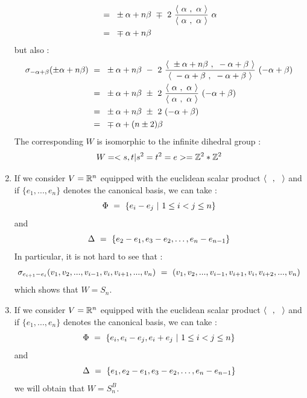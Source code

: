 \begin{enumerate}
\begin{equation}
\begin{split}
	&=\text{ }  \pm\alpha +n\beta\text{ } \mp\text{ } 2\text{ } \frac{\langle\text{ } \alpha \text{ },\text{ }\alpha\text{ }\rangle}{\langle\text{ } \alpha\text{ },\text{ }\alpha\text{ }\rangle}\text{ }\alpha \\
	&=\text{ } \mp \alpha +n\beta
	\end{split}
	\end{equation}
	but also :
	\begin{equation}
	\begin{split}
	\sigma_{-\alpha+\beta}(\pm\alpha+n\beta)\text{ } &=\text{ }  \pm\alpha+n\beta\text{ } -\text{ } 2\text{ } \frac{\langle\text{ } \pm\alpha+n\beta\text{ },\text{ }-\alpha+\beta\text{ }\rangle}{\langle\text{ } -\alpha+\beta\text{ },\text{ }-\alpha+\beta\text{ }\rangle}\text{ }(-\alpha+\beta)\\
	&=\text{ } \pm\alpha+n\beta\text{ } \pm\text{ } 2\text{ } \frac{\langle\text{ } \alpha\text{ },\text{ }\alpha\text{ }\rangle}{\langle\text{ } \alpha\text{ },\text{ }\alpha\text{ }\rangle}\text{ }(-\alpha+\beta)\\
	&=\text{ }\pm \alpha+n\beta\text{ } \pm\text{ } 2\text{ } (-\alpha+\beta)\\
	&=\text{ } \mp \alpha +(n\pm 2)\beta
	\end{split}
	\end{equation}
	The corresponding $W$ is isomorphic to the infinite dihedral group :
	$$W=<s,t\lvert s^2=t^2=e>=\mathbb Z^2*\mathbb Z^2$$
	\item If we consider $V=\mathbb R^n$ equipped with the euclidean scalar product  $\langle\text{ } \text{ },\text{ }\text{ }\rangle$ and if $\{e_1,...,e_n\}$ denotes the canonical basis, we can take :
	\begin{equation}
	\Phi\text{ } =\text{ } \{e_i-e_j\text{ }\lvert\text{ } 1\leq i<j\leq n\}
	\end{equation}
	and
	\begin{equation}
	\Delta\text{ } =\text{ } \{e_2-e_1,e_3-e_2,\dots,e_n-e_{n-1} \}
	\end{equation}
	In particular, it is not hard to see that :
	\begin{equation}
	\sigma_{e_{i+1}-e_i}(v_1,v_2,...,v_{i-1},v_i,v_{i+1},...,v_n)\text{ }=\text{ } (v_1,v_2,...,v_{i-1},v_{i+1},v_i,v_{i+2},...,v_n)
	\end{equation}
	which shows that $W=S_n$.
	\item If we consider $V=\mathbb R^n$ equipped with the euclidean scalar product  $\langle\text{ } \text{ },\text{ }\text{ }\rangle$ and if $\{e_1,...,e_n\}$ denotes the canonical basis, we can take :
	\begin{equation}
	\Phi\text{ } =\text{ } \{e_i, e_i-e_j,e_i+e_j\text{ }\lvert\text{ } 1\leq i<j\leq n\}
	\end{equation}
	and
	\begin{equation}
	\Delta\text{ } =\text{ } \{e_1,e_2-e_1,e_3-e_2,\dots,e_n-e_{n-1} \}
	\end{equation}
	we will obtain that $W=S_n^B$.
\end{enumerate}
